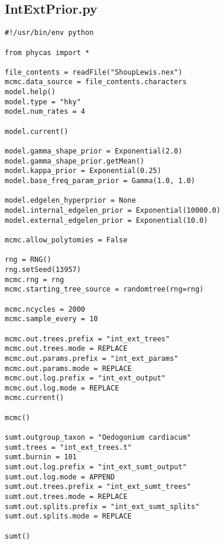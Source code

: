\documentclass{article}
\begin{document}
\subsection{IntExtPrior.py}\label{IntExtPrior}
\begin{verbatim}
#!/usr/bin/env python

from phycas import *

file_contents = readFile("ShoupLewis.nex")
mcmc.data_source = file_contents.characters
model.help()
model.type = "hky"
model.num_rates = 4

model.current()

model.gamma_shape_prior = Exponential(2.0)
model.gamma_shape_prior.getMean()
model.kappa_prior = Exponential(0.25)
model.base_freq_param_prior = Gamma(1.0, 1.0)

model.edgelen_hyperprior = None
model.internal_edgelen_prior = Exponential(10000.0)
model.external_edgelen_prior = Exponential(10.0)

mcmc.allow_polytomies = False

rng = RNG()
rng.setSeed(13957)
mcmc.rng = rng
mcmc.starting_tree_source = randomtree(rng=rng)

mcmc.ncycles = 2000
mcmc.sample_every = 10

mcmc.out.trees.prefix = "int_ext_trees" 
mcmc.out.trees.mode = REPLACE 
mcmc.out.params.prefix = "int_ext_params" 
mcmc.out.params.mode = REPLACE 
mcmc.out.log.prefix = "int_ext_output" 
mcmc.out.log.mode = REPLACE 
mcmc.current()

mcmc()

sumt.outgroup_taxon = "Oedogonium cardiacum" 
sumt.trees = "int_ext_trees.t" 
sumt.burnin = 101 
sumt.out.log.prefix = "int_ext_sumt_output" 
sumt.out.log.mode = APPEND 
sumt.out.trees.prefix = "int_ext_sumt_trees" 
sumt.out.trees.mode = REPLACE 
sumt.out.splits.prefix = "int_ext_sumt_splits" 
sumt.out.splits.mode = REPLACE 

sumt()
\end{verbatim}


\newpage

\end{document}
